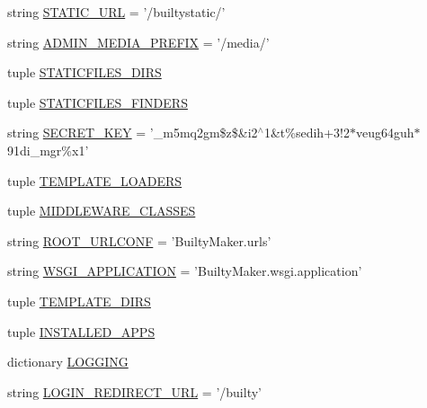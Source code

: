\begin{DoxyCompactItemize}
\item 
string \hyperlink{namespaceBuiltyMaker_1_1settings_acc4654aed90815f7b042342578725459}{\-S\-T\-A\-T\-I\-C\-\_\-\-U\-R\-L} = '/builtystatic/'
\item 
string \hyperlink{namespaceBuiltyMaker_1_1settings_adf5ce0536c36ce843074ceb90d253808}{\-A\-D\-M\-I\-N\-\_\-\-M\-E\-D\-I\-A\-\_\-\-P\-R\-E\-F\-I\-X} = '/media/'
\item 
tuple \hyperlink{namespaceBuiltyMaker_1_1settings_a8db37f9e0004689a9e5788648db5000c}{\-S\-T\-A\-T\-I\-C\-F\-I\-L\-E\-S\-\_\-\-D\-I\-R\-S}
\item 
tuple \hyperlink{namespaceBuiltyMaker_1_1settings_a16d9141ceaabcb9448e3905e23792f08}{\-S\-T\-A\-T\-I\-C\-F\-I\-L\-E\-S\-\_\-\-F\-I\-N\-D\-E\-R\-S}
\item 
string \hyperlink{namespaceBuiltyMaker_1_1settings_aa82568a23fb5cf4baef09de939bca69b}{\-S\-E\-C\-R\-E\-T\-\_\-\-K\-E\-Y} = '\-\_\-m5mq2gm\$z\$\&i2$^\wedge$1\&t\%sedih+3!2$\ast$veug64guh$\ast$91di\-\_\-mgr\%x1'
\item 
tuple \hyperlink{namespaceBuiltyMaker_1_1settings_a18dc06dd6238439837ab2c6d7972c059}{\-T\-E\-M\-P\-L\-A\-T\-E\-\_\-\-L\-O\-A\-D\-E\-R\-S}
\item 
tuple \hyperlink{namespaceBuiltyMaker_1_1settings_a6fc30f431898973ff2b51145722948c8}{\-M\-I\-D\-D\-L\-E\-W\-A\-R\-E\-\_\-\-C\-L\-A\-S\-S\-E\-S}
\item 
string \hyperlink{namespaceBuiltyMaker_1_1settings_aed00a20e1c0e06b34dc1f735c3e2168a}{\-R\-O\-O\-T\-\_\-\-U\-R\-L\-C\-O\-N\-F} = '\-Builty\-Maker.\-urls'
\item 
string \hyperlink{namespaceBuiltyMaker_1_1settings_a9516690bab893efb7b775d7578991506}{\-W\-S\-G\-I\-\_\-\-A\-P\-P\-L\-I\-C\-A\-T\-I\-O\-N} = '\-Builty\-Maker.\-wsgi.\-application'
\item 
tuple \hyperlink{namespaceBuiltyMaker_1_1settings_a17b65a68ce85003a5ceb3dda2542bdf4}{\-T\-E\-M\-P\-L\-A\-T\-E\-\_\-\-D\-I\-R\-S}
\item 
tuple \hyperlink{namespaceBuiltyMaker_1_1settings_a4914b3ed7ade29e8bdb72f5cb31b03e9}{\-I\-N\-S\-T\-A\-L\-L\-E\-D\-\_\-\-A\-P\-P\-S}
\item 
dictionary \hyperlink{namespaceBuiltyMaker_1_1settings_a2d482d37b32220d29a212c783d38e563}{\-L\-O\-G\-G\-I\-N\-G}
\item 
string \hyperlink{namespaceBuiltyMaker_1_1settings_a3053c7b1230d65c2bb3455164ac28000}{\-L\-O\-G\-I\-N\-\_\-\-R\-E\-D\-I\-R\-E\-C\-T\-\_\-\-U\-R\-L} = '/builty'
\end{DoxyCompactItemize}


